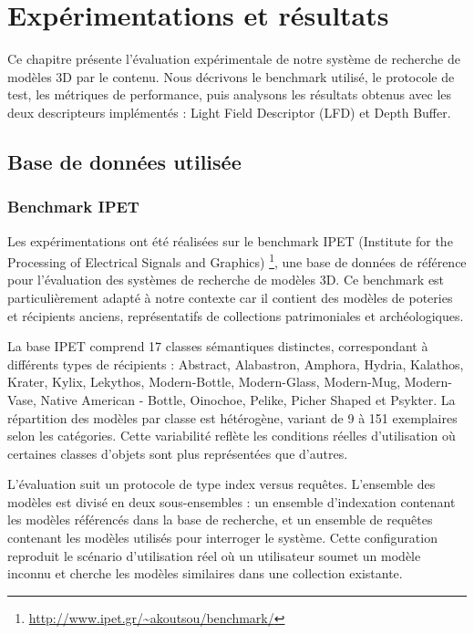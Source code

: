\documentclass[11pt,a4paper,oneside]{report}
\begin{document}

\chapter{Expérimentations et résultats}

Ce chapitre présente l'évaluation expérimentale de notre système de recherche de modèles 3D par le contenu. Nous décrivons le benchmark utilisé, le protocole de test, les métriques de performance, puis analysons les résultats obtenus avec les deux descripteurs implémentés : Light Field Descriptor (LFD) et Depth Buffer.

\section{Base de données utilisée}

\subsection{Benchmark IPET}

Les expérimentations ont été réalisées sur le benchmark IPET (Institute for the Processing of Electrical Signals and Graphics) \footnote{\url{http://www.ipet.gr/~akoutsou/benchmark/}}, une base de données de référence pour l'évaluation des systèmes de recherche de modèles 3D. Ce benchmark est particulièrement adapté à notre contexte car il contient des modèles de poteries et récipients anciens, représentatifs de collections patrimoniales et archéologiques.

La base IPET comprend 17 classes sémantiques distinctes, correspondant à différents types de récipients : Abstract, Alabastron, Amphora, Hydria, Kalathos, Krater, Kylix, Lekythos, Modern-Bottle, Modern-Glass, Modern-Mug, Modern-Vase, Native American - Bottle, Oinochoe, Pelike, Picher Shaped et Psykter. La répartition des modèles par classe est hétérogène, variant de 9 à 151 exemplaires selon les catégories. Cette variabilité reflète les conditions réelles d'utilisation où certaines classes d'objets sont plus représentées que d'autres.

L'évaluation suit un protocole de type index versus requêtes. L'ensemble des modèles est divisé en deux sous-ensembles : un ensemble d'indexation contenant les modèles référencés dans la base de recherche, et un ensemble de requêtes contenant les modèles utilisés pour interroger le système. Cette configuration reproduit le scénario d'utilisation réel où un utilisateur soumet un modèle inconnu et cherche les modèles similaires dans une collection existante.
\end{document}
